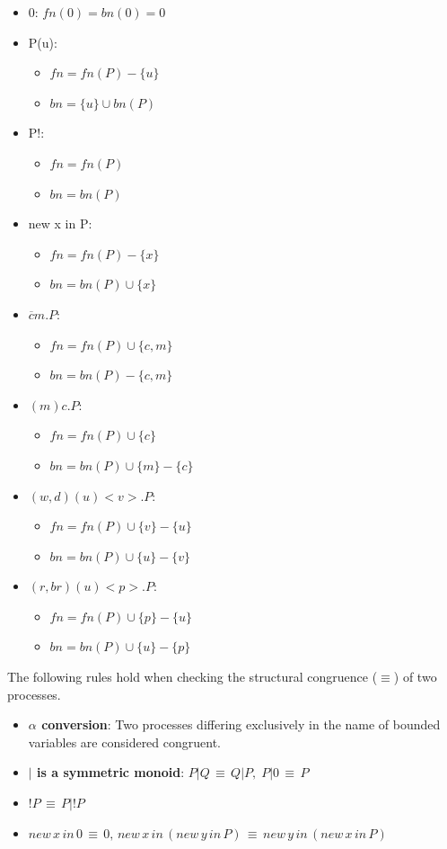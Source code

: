 \begin{itemize}
\item 0: $fn(0) = bn(0) = 0 $
\item P(u):
  \begin{itemize}
    \item $fn = fn(P) - \{ u \}$
    \item $bn = \{u\} \cup bn(P)$
  \end{itemize}
\item P!:
  \begin{itemize}
    \item $fn = fn(P)$
    \item $bn = bn(P)$
  \end{itemize}
\item new x in P:
  \begin{itemize}
    \item $fn = fn(P) - \{ x \}$
    \item $bn = bn(P) \cup \{x\} $
  \end{itemize}
\item $\overline{c}m.P$:
  \begin{itemize}
    \item $fn = fn(P) \cup \{ c, m \}$
    \item $bn = bn(P) - \{ c, m\}$
  \end{itemize}
\item $(m)c.P$:
  \begin{itemize}
    \item $fn = fn(P) \cup \{ c\}$
    \item $bn = bn(P) \cup \{ m \} - \{ c\}$
  \end{itemize}
\item $(w,d)(u)<v>.P$:
  \begin{itemize}
    \item $fn = fn(P) \cup \{ v \} - \{ u \}$
    \item $bn = bn(P) \cup \{ u \} - \{ v\}$
  \end{itemize}
\item $(r,br)(u)<p>.P$:
  \begin{itemize}
    \item $fn = fn(P) \cup \{ p \} - \{ u \}$
    \item $bn = bn(P) \cup \{ u \} - \{ p\}$
  \end{itemize}
\end{itemize}

The following rules hold when checking the structural congruence ($\equiv$) of two processes.
\begin{itemize}
  \item{\bf $\alpha$ conversion}: Two processes differing exclusively in the name of bounded variables are considered congruent.
  \item{\bf $|$ is a symmetric monoid}: $P|Q\,\equiv\,Q|P,\;P|0\,\equiv\,P$
  \item $!P\,\equiv\,P|!P$
  \item $new\,x\,in\,0\,\equiv\,0,\,new\,x\,in\,(new\,y\,in\,P)\,\equiv\,new\,y\,in\,(new\,x\,in\,P)$
\end{itemize}
